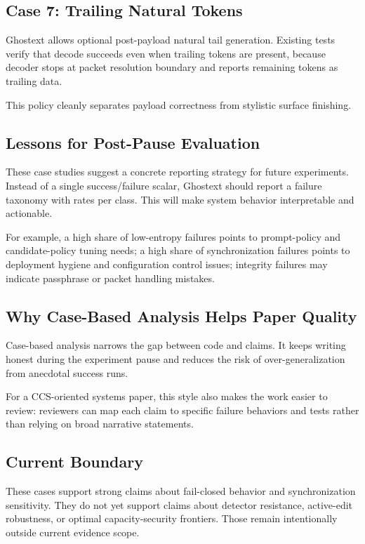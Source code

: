 \subsection{Case 7: Trailing Natural Tokens}

Ghostext allows optional post-payload natural tail generation. Existing tests verify that decode succeeds even when trailing tokens are present, because decoder stops at packet resolution boundary and reports remaining tokens as trailing data.

This policy cleanly separates payload correctness from stylistic surface finishing.

\subsection{Lessons for Post-Pause Evaluation}

These case studies suggest a concrete reporting strategy for future experiments. Instead of a single success/failure scalar, Ghostext should report a failure taxonomy with rates per class. This will make system behavior interpretable and actionable.

For example, a high share of low-entropy failures points to prompt-policy and candidate-policy tuning needs; a high share of synchronization failures points to deployment hygiene and configuration control issues; integrity failures may indicate passphrase or packet handling mistakes.

\subsection{Why Case-Based Analysis Helps Paper Quality}

Case-based analysis narrows the gap between code and claims. It keeps writing honest during the experiment pause and reduces the risk of over-generalization from anecdotal success runs.

For a CCS-oriented systems paper, this style also makes the work easier to review: reviewers can map each claim to specific failure behaviors and tests rather than relying on broad narrative statements.

\subsection{Current Boundary}

These cases support strong claims about fail-closed behavior and synchronization sensitivity. They do not yet support claims about detector resistance, active-edit robustness, or optimal capacity-security frontiers. Those remain intentionally outside current evidence scope.
